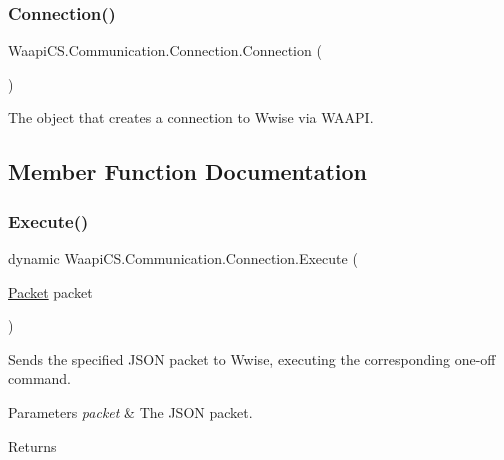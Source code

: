 \subsubsection{\texorpdfstring{Connection()}{Connection()}}
{\footnotesize\ttfamily Waapi\+C\+S.\+Communication.\+Connection.\+Connection (\begin{DoxyParamCaption}{ }\end{DoxyParamCaption})}



The object that creates a connection to Wwise via W\+A\+A\+PI. 



\subsection{Member Function Documentation}
\mbox{\label{class_waapi_c_s_1_1_communication_1_1_connection_a14ecc5c888dded234beb95f975e1d708}} 
\subsubsection{\texorpdfstring{Execute()}{Execute()}\hspace{0.1cm}{\footnotesize\ttfamily [1/2]}}
{\footnotesize\ttfamily dynamic Waapi\+C\+S.\+Communication.\+Connection.\+Execute (\begin{DoxyParamCaption}\item[{\mbox{\hyperlink{class_waapi_c_s_1_1_communication_1_1_packet}{Packet}}}]{packet }\end{DoxyParamCaption})}



Sends the specified J\+S\+ON packet to Wwise, executing the corresponding one-\/off command. 


\begin{DoxyParams}{Parameters}
{\em packet} & The J\+S\+ON packet.\\
\hline
\end{DoxyParams}
\begin{DoxyReturn}{Returns}

\end{DoxyReturn}
\mbox{\label{class_waapi_c_s_1_1_communication_1_1_connection_a7b579e64444614a48bdfb6b492e4efc0}} 

